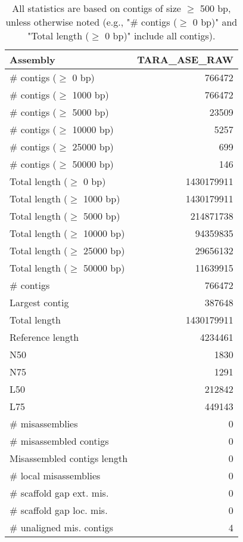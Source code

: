 \documentclass[12pt,a4paper]{article}
\begin{document}
\begin{table}[ht]
\begin{center}
\caption{All statistics are based on contigs of size $\geq$ 500 bp, unless otherwise noted (e.g., "\# contigs ($\geq$ 0 bp)" and "Total length ($\geq$ 0 bp)" include all contigs).}
\begin{tabular}{|l*{1}{|r}|}
\hline
Assembly & TARA\_ASE\_RAW \\ \hline
\# contigs ($\geq$ 0 bp) & 766472 \\ \hline
\# contigs ($\geq$ 1000 bp) & 766472 \\ \hline
\# contigs ($\geq$ 5000 bp) & 23509 \\ \hline
\# contigs ($\geq$ 10000 bp) & 5257 \\ \hline
\# contigs ($\geq$ 25000 bp) & 699 \\ \hline
\# contigs ($\geq$ 50000 bp) & 146 \\ \hline
Total length ($\geq$ 0 bp) & 1430179911 \\ \hline
Total length ($\geq$ 1000 bp) & 1430179911 \\ \hline
Total length ($\geq$ 5000 bp) & 214871738 \\ \hline
Total length ($\geq$ 10000 bp) & 94359835 \\ \hline
Total length ($\geq$ 25000 bp) & 29656132 \\ \hline
Total length ($\geq$ 50000 bp) & 11639915 \\ \hline
\# contigs & 766472 \\ \hline
Largest contig & 387648 \\ \hline
Total length & 1430179911 \\ \hline
Reference length & 4234461 \\ \hline
N50 & 1830 \\ \hline
N75 & 1291 \\ \hline
L50 & 212842 \\ \hline
L75 & 449143 \\ \hline
\# misassemblies & 0 \\ \hline
\# misassembled contigs & 0 \\ \hline
Misassembled contigs length & 0 \\ \hline
\# local misassemblies & 0 \\ \hline
\# scaffold gap ext. mis. & 0 \\ \hline
\# scaffold gap loc. mis. & 0 \\ \hline
\# unaligned mis. contigs & 4 \\ \hline

\end{tabular}
\end{center}
\end{table}
\end{document}
